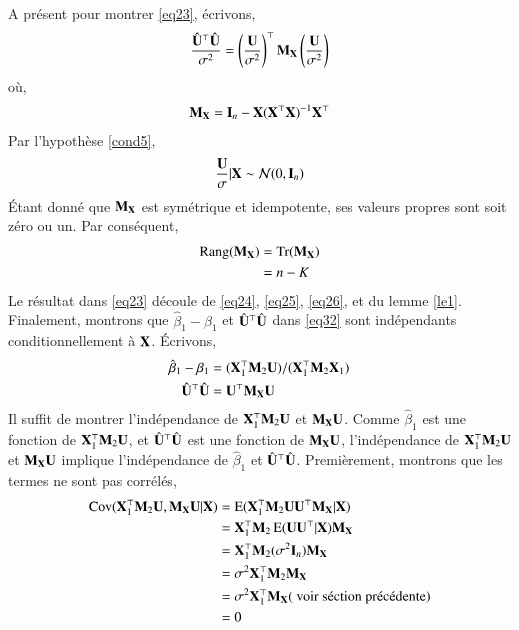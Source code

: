\documentclass[10pt, reqno]{amsart}
\begin{document}
A présent pour montrer \eqref{eq23}, écrivons,
\begin{align}
\frac{\hat{\mathbf U}^\top\hat{\mathbf U}}{\sigma^2} = \left(\frac{\mathbf U}{\sigma^2}\right)^\top\mathbf M_\mathbf X\left(\frac{\mathbf U}{\sigma^2}\right)
\label{eq24}
\end{align}
où,
\begin{align*}
\mathbf M_\mathbf X=\mathbf{I}_n - \mathbf X(\mathbf X^\top\mathbf X)^{-1}\mathbf X^\top
\end{align*}
Par l'hypothèse \ref{cond5},
\begin{align}
\frac{\mathbf U}{\sigma} | \mathbf X\sim\mathcal{N}(0, \mathbf{I}_n)
\label{eq25}
\end{align}
\'Etant donné que $\mathbf M_\mathbf X$ est symétrique et idempotente, ses valeurs propres sont soit zéro ou un. Par conséquent,
\begin{align}
\mathrm{Rang}(\mathbf M_\mathbf X) &= \operatorname{Tr}(\mathbf M_\mathbf X) \nonumber\\
&=n-K
\label{eq26}
\end{align}
Le résultat dans \eqref{eq23} découle de \eqref{eq24},  \eqref{eq25},  \eqref{eq26}, et du lemme \ref{le1}.\\
Finalement, montrons que $\hat{\beta}_1 - \beta_1$ et $\hat{\mathbf U}^\top\hat{\mathbf U}$ dans \eqref{eq32} sont indépendants conditionnellement à $\mathbf X$. \'Ecrivons,
\begin{align*}
\hat{\beta}_1-\beta_1 &= (\mathbf X_1^\top\mathbf M_2\mathbf U)/(\mathbf X_1^\top\mathbf M_2\mathbf X_1)\\
\hat{\mathbf U}^\top\hat{\mathbf U}&=\mathbf U^\top\mathbf M_\mathbf X\mathbf U
\end{align*}
Il suffit de montrer l'indépendance de $\mathbf X_1^\top\mathbf M_2\mathbf U$ et  $\mathbf M_\mathbf X\mathbf U$. Comme $\hat{\beta}_1$ est une fonction de $\mathbf X_1^\top\mathbf M_2\mathbf U$, et $\hat{\mathbf U}^\top\hat{\mathbf U}$ est une fonction de $\mathbf M_\mathbf X\mathbf U$, l'indépendance de $\mathbf X_1^\top\mathbf M_2\mathbf U$ et  $\mathbf M_\mathbf X\mathbf U$ implique l'indépendance de $\hat{\beta}_1$ et $\hat{\mathbf U}^\top\hat{\mathbf U}$. Premièrement, montrons que les termes ne sont pas corrélés,
\begin{align*}
\operatorname{Cov}(\mathbf X_1^\top\mathbf M_2\mathbf U, \mathbf M_\mathbf X\mathbf U | \mathbf X) &=\operatorname{E}(\mathbf X_1^\top\mathbf M_2\mathbf U\mathbf U^\top \mathbf M_\mathbf X|\mathbf X)\\
&=\mathbf X_1^\top\mathbf M_2\operatorname{E}(\mathbf U\mathbf U^\top|\mathbf X)\mathbf M_\mathbf X\\
&=\mathbf X_1^\top\mathbf M_2(\sigma^2\mathbf{I}_n)\mathbf M_\mathbf X\\
&=\sigma^2\mathbf X_1^\top\mathbf M_2\mathbf M_\mathbf X\\
&=\sigma^2\mathbf X_1^\top\mathbf M_\mathbf X( \ \textrm{voir séction précédente})\\
&=0
\end{align*}
\end{document}
